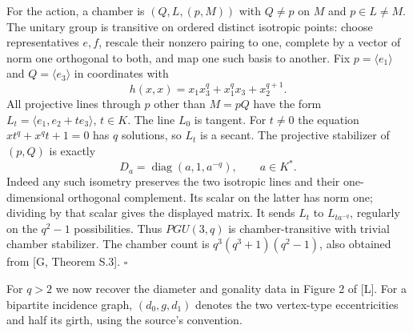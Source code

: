 For the action, a chamber is $(Q,L,(p,M))$ with $Q\ne p$ on $M$ and
$p\in L\ne M$. The unitary group is transitive on ordered distinct
isotropic points: choose representatives $e,f$, rescale their nonzero
pairing to one, complete by a vector of norm one orthogonal to both,
and map one such basis to another. Fix $p=\langle e_1\rangle$ and
$Q=\langle e_3\rangle$ in coordinates with
\[
h(x,x)=x_1x_3^q+x_1^qx_3+x_2^{q+1}.
\]
All projective lines through $p$ other than $M=pQ$ have the form
$L_t=\langle e_1,e_2+t e_3\rangle$, $t\in K$.
The line $L_0$ is tangent. For $t\ne0$ the equation
$x t^q+x^qt+1=0$ has $q$ solutions, so $L_t$ is a secant.
The projective stabilizer of $(p,Q)$ is exactly
\[
D_a=\operatorname{diag}(a,1,a^{-q}),\qquad a\in K^*.
\]
Indeed any such isometry preserves the two isotropic lines and their
one-dimensional orthogonal complement. Its scalar on the latter has
norm one; dividing by that scalar gives the displayed matrix. It sends
$L_t$ to $L_{t a^{-q}}$, regularly on the $q^2-1$ possibilities. Thus
$PGU(3,q)$ is chamber-transitive with trivial chamber stabilizer. The
chamber count is
$q^3(q^3+1)(q^2-1)$, also obtained from [G, Theorem S.3]. \hfill$\square$

For $q>2$ we now recover the diameter and gonality data in Figure 2 of
[L]. For a bipartite incidence graph, $(d_0,g,d_1)$ denotes the two
vertex-type eccentricities and half its girth, using the source's
convention.
